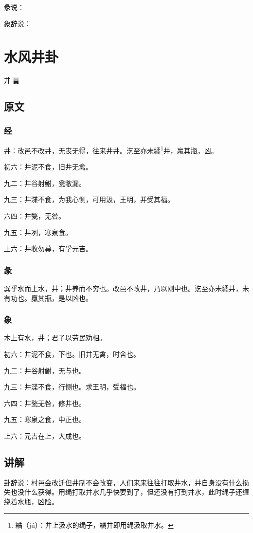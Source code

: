 \documentclass[12pt,oneside]{book}
\begin{document}
彖说：

象辞说：

\chapter{水风井卦}
井 {\Large ䷯}

\section{原文}

\subsection{经}
井：改邑不改井，无丧无得，往来井井。汔至亦未繘\footnote{繘（jú）：井上汲水的绳子，繘井即用绳汲取井水。}井，羸其瓶，凶。

初六：井泥不食，旧井无禽。

九二：井谷射鲋，瓮敝漏。

九三：井渫不食，为我心恻，可用汲，王明，并受其福。

六四：井甃，无咎。

九五：井冽，寒泉食。

上六：井收勿幕，有孚元吉。

\subsection{彖}
巽乎水而上水，井；井养而不穷也。改邑不改井，乃以刚中也。汔至亦未繘井，未有功也。羸其瓶，是以凶也。

\subsection{象}
木上有水，井；君子以劳民劝相。

初六：井泥不食，下也。旧井无禽，时舍也。

九二：井谷射鲋，无与也。

九三：井渫不食，行恻也。求王明，受福也。

六四：井甃无咎，修井也。

九五：寒泉之食，中正也。

上六：元吉在上，大成也。

\section{讲解}
卦辞说：村邑会改迁但井制不会改变，人们来来往往打取井水，井自身没有什么损失也没什么获得。用绳打取井水几乎快要到了，但还没有打到井水，此时绳子还缠绕着水瓶，凶险。
\end{document}

